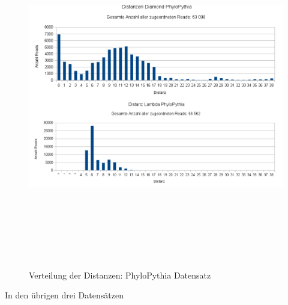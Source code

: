 \documentclass[10pt, a4paper]{article}[08.12.2015]
\begin{document}
     \begin{figure}[H]
      \centering
      \noindent\includegraphics[width=\linewidth,height=15cm,
      keepaspectratio]{Abbildungen/PhyloPythia_Distanzen_both.png}
      \caption{Verteilung der Distanzen: PhyloPythia Datensatz}
    \end{figure}
    
    
In den \"ubrigen drei Datens\"atzen 
\end{document}
